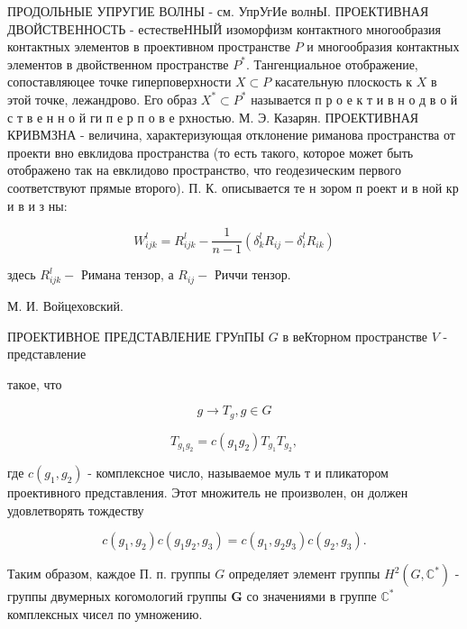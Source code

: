 \documentclass[10pt]{article}
\begin{document}
ПРОДОЛЬНЫЕ УПРУГИЕ ВОЛНЫ - см. УпрУгИе волнЫ. ПРОЕКТИВНАЯ ДВОЙСТВЕННОСТЬ - естествеННЫЙ изоморфизм контактного многообразия контактных элементов в проективном пространстве $P$ и многообразия контактных элементов в двойственном пространстве $P^{*}$. Тангенциальное отображение, сопоставляюцее точке гиперповерхности $X \subset P$ касательную плоскость к $X$ в этой точке, лежандрово. Его образ $X^{*} \subset P^{*}$ называется п р о е к т и в н о д в о й с т в е н н о й ги п е р п о в е рхностью. М. Э. Казарян. ПРОЕКТИВНАЯ КРИВМЗНА - величина, характеризующая отклонение риманова пространства от проекти вно евклидова пространства (то есть такого, которое может быть отображено так на евклидово пространство, что геодезическим первого соответствуют прямые второго). П. К. описывается те н зором п роект и в ной кр и в и з ны:



\[

W_{i j k}^{l}=R_{i j k}^{l}-\frac{1}{n-1}\left(\delta_{k}^{l} R_{i j}-\delta_{i}^{l} R_{i k}\right)

\]



здесь $R_{i j k}^{l}-$ Римана тензор, а $R_{i j}-$ Риччи тензор.



М. И. Войцеховский.



ПРОЕКТИВНОЕ ПРЕДСТАВЛЕНИЕ ГРУпПЫ $G$ в веКторном пространстве $V$ - представление



такое, что



\[

g \rightarrow T_{g}, g \in G

\]



\[

T_{g_{1} g_{2}}=c\left(g_{1} g_{2}\right) T_{g_{1}} T_{g_{2}},

\]



где $c\left(g_{1}, g_{2}\right)$ - комплексное число, называемое муль т и пликатором проективного представления. Этот множитель не произволен, он должен удовлетворять тождеству



\[

c\left(g_{1}, g_{2}\right) c\left(g_{1} g_{2}, g_{3}\right)=c\left(g_{1}, g_{2} g_{3}\right) c\left(g_{2}, g_{3}\right) .

\]



Таким образом, каждое П. п. группы $G$ определяет элемент группы $H^{2}\left(G, \mathbb{C}^{*}\right)$ - группы двумерных когомологий группы $\boldsymbol{G}$ со значениями в группе $\mathbb{C}^{*}$ комплексных чисел по умножению.
\end{document}
